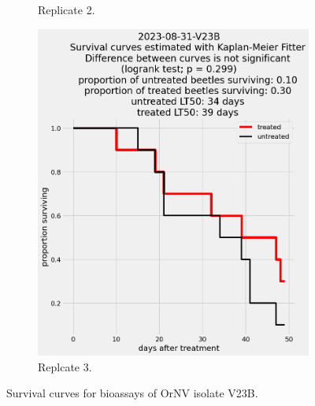 \documentclass[12pt,letterpaper,english,bibliography=totocnumbered, abstract=on]{scrartcl}
\begin{document}
\begin{figure}[h]
\begin{subfigure}{.3\textwidth}
		\caption{Replicate 2.}
	\end{subfigure}
	\begin{subfigure}{.3\textwidth}
		\includegraphics[width=\textwidth]{images/survival_curves/2023-08-31-V23B}
		\caption{Replcate 3.}
	\end{subfigure}
	\caption{Survival curves for bioassays of OrNV isolate V23B.}
	\label{fig:V23B survival curves}
\end{figure}

\end{document}
